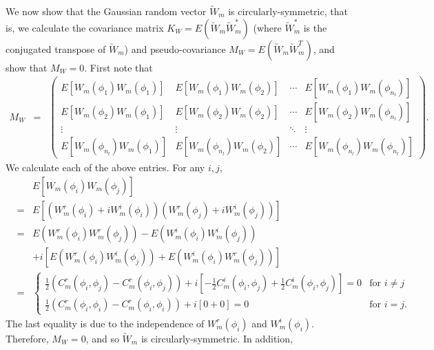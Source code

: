 We now show that the Gaussian random vector $\utilde{W}_m$ is circularly-symmetric, that is, we calculate the covariance matrix $K_W = E(\utilde{W}_m\utilde{W}_m^*)$ (where $\utilde{W}_m^*$ is the conjugated transpose of $\utilde{W}_m$) and pseudo-covariance $M_W = E(\utilde{W}_m\utilde{W}_m^T)$, and show that $M_W=0$. First note that 
	\begin{eqnarray*}
		M_W & = & \left(\begin{array}{cccc}
		E[W_m(\phi_1) W_m(\phi_1) ] & E[W_m(\phi_1) W_m(\phi_2) ]  & \cdots & E[W_m(\phi_1) W_m(\phi_{n_l}) ]\\
		E[W_m(\phi_2) W_m(\phi_1) ] & E[W_m(\phi_2) W_m(\phi_2) ]  & \cdots & E[W_m(\phi_2) W_m(\phi_{n_l}) ]\\
		\vdots & \vdots  & \ddots & \vdots \\
		E[W_m(\phi_{n_l}) W_m(\phi_1) ] & E[W_m(\phi_{n_l}) W_m(\phi_2) ]  & \cdots & E[W_m(\phi_{n_l}) W_m(\phi_{n_l})]
		\end{array}
		\right).
	\end{eqnarray*}
We calculate each of the above entries.	For any $i,j$,
	\begin{eqnarray*}
		& & E[W_m(\phi_i) W_m(\phi_j) ]\\
		&=& E[(W_m^r(\phi_i) + i W_m^i(\phi_i))(W_m^r(\phi_j) + i W_m^i(\phi_j))] \\
		&=& E(W_m^r(\phi_i)W_m^r(\phi_j)) - E(W_m^i(\phi_i)W_m^i(\phi_j)) \\
		& & + i[E(W_m^r(\phi_i)W_m^i(\phi_j)) + E(W_m^i(\phi_i)W_m^r(\phi_j))] \\
		&=& \left\{\begin{array}{ll}
        \frac{1}{2}(C_m^r(\phi_i, \phi_j) - C_m^r(\phi_i, \phi_j)) + i [-\frac{1}{2} C_m^i(\phi_i, \phi_j) + \frac{1}{2}C_m^i(\phi_i, \phi_j)] = 0 & \mbox{for $i \ne j$} \\
		\frac{1}{2}(C_m^r(\phi_i, \phi_i) - C_m^r(\phi_i, \phi_i)) + i [0 + 0] = 0 &  \mbox{for $i = j$}.
\end{array}
\right.
	\end{eqnarray*}
The last equality is due to the independence of $W_m^r(\phi_i)$ and $W_m^i(\phi_i)$. Therefore, $M_W = 0$, and so $\utilde{W}_m$ is circularly-symmetric. In addition,
